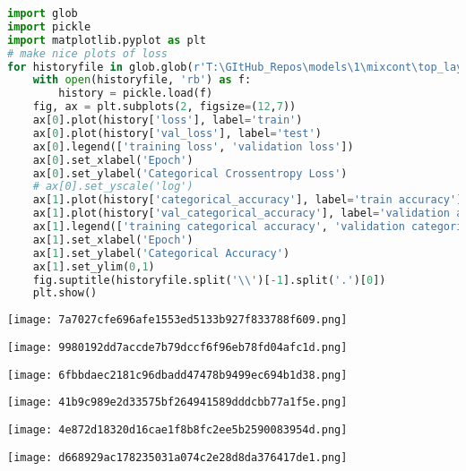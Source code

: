 \begin{lstlisting}[language=Python]
import glob
import pickle
import matplotlib.pyplot as plt
# make nice plots of loss
for historyfile in glob.glob(r'T:\GItHub_Repos\models\1\mixcont\top_layer\*\*\*.pkl'):
    with open(historyfile, 'rb') as f:
        history = pickle.load(f)
    fig, ax = plt.subplots(2, figsize=(12,7))
    ax[0].plot(history['loss'], label='train')
    ax[0].plot(history['val_loss'], label='test')
    ax[0].legend(['training loss', 'validation loss'])
    ax[0].set_xlabel('Epoch')
    ax[0].set_ylabel('Categorical Crossentropy Loss')
    # ax[0].set_yscale('log')
    ax[1].plot(history['categorical_accuracy'], label='train accuracy')
    ax[1].plot(history['val_categorical_accuracy'], label='validation accuracy')
    ax[1].legend(['training categorical accuracy', 'validation categorical accuracy'])
    ax[1].set_xlabel('Epoch')
    ax[1].set_ylabel('Categorical Accuracy')
    ax[1].set_ylim(0,1)
    fig.suptitle(historyfile.split('\\')[-1].split('.')[0])
    plt.show()
\end{lstlisting}

\texttt{[image: 7a7027cfe696afe1553ed5133b927f833788f609.png]}

\texttt{[image: 9980192dd7accde7b79dccf6f96eb78fd04afc1d.png]}

\texttt{[image: 6fbbdaec2181c96dbadd47478b9499ec694b1d38.png]}

\texttt{[image: 41b9c989e2d33575bf264941589dddcbb77a1f5e.png]}

\texttt{[image: 4e872d18320d16cae1f8b8fc2ee5b2590083954d.png]}

\texttt{[image: d668929ac178235031a074c2e28d8da376417de1.png]}
